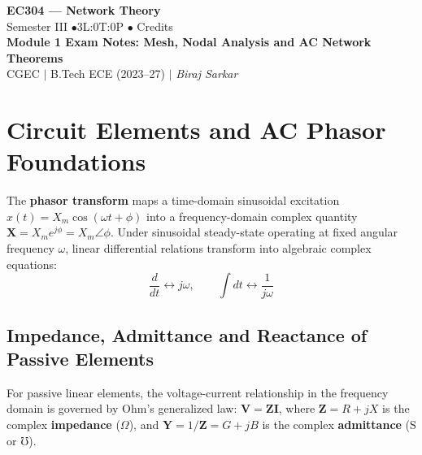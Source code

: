 \documentclass[12pt,a4paper]{article}
\begin{document}
\begin{center}
  {\LARGE\bfseries\color{myred} EC304 --- Network Theory}\\[5pt]
  {\normalsize\color{mydark} Semester III \quad$\bullet$\quad 3L:0T:0P \quad$\bullet$ Credits}\\[3pt]
  {\normalsize\color{myteal}\textbf{Module 1 Exam Notes: Mesh, Nodal Analysis and AC Network Theorems}}\\[3pt]
  {\small\color{mydark} CGEC \;$|$\; B.Tech ECE (2023--27) \;$|$\; \textit{Biraj Sarkar}}
\end{center}
\vspace{2pt}
\noindent{\color{myred}\rule{\linewidth}{1.5pt}}
\vspace{2pt}

\hypersetup{linkcolor=mydark}
\tableofcontents
\hypersetup{linkcolor=myteal}
\newpage

\section{Circuit Elements and AC Phasor Foundations}

\begin{tcolorbox}[defbox, title={\textbf{Definition: Phasor Transform in Sinusoidal Steady-State}}]
The \textbf{phasor transform} maps a time-domain sinusoidal excitation $x(t) = X_m \cos(\omega t + \phi)$ into a frequency-domain complex quantity $\mathbf{X} = X_m e^{j\phi} = X_m \angle \phi$. Under sinusoidal steady-state operating at fixed angular frequency $\omega$, linear differential relations transform into algebraic complex equations:
\begin{equation}
  \frac{d}{dt} \longleftrightarrow j\omega, \qquad \int dt \longleftrightarrow \frac{1}{j\omega}
\end{equation}
\end{tcolorbox}

\subsection{Impedance, Admittance and Reactance of Passive Elements}
For passive linear elements, the voltage-current relationship in the frequency domain is governed by Ohm's generalized law: $\mathbf{V} = \mathbf{Z} \mathbf{I}$, where $\mathbf{Z} = R + jX$ is the complex \textbf{impedance} ($\Omega$), and $\mathbf{Y} = 1/\mathbf{Z} = G + jB$ is the complex \textbf{admittance} ($\text{S}$ or $\mho$).
\end{document}
